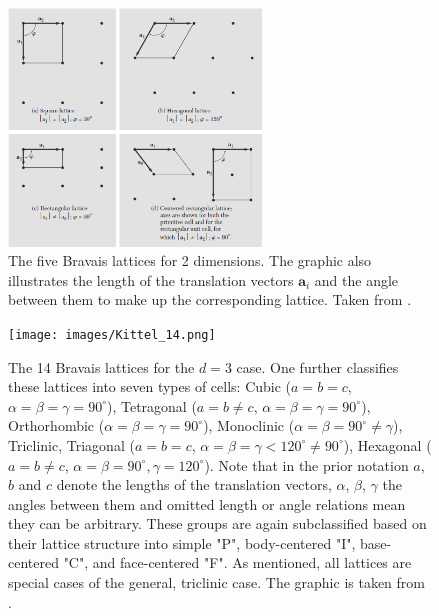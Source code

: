 \documentclass[11pt,a4paper]{article}
\begin{document}
\begin{figure}[htbp]
\centering
\includegraphics[width=0.6\textwidth]{images/Kittel_7.png}
\caption{The five Bravais lattices for 2 dimensions. The graphic also illustrates the length of the translation vectors $\bm{a}_i$ and the angle between them to make up the corresponding lattice. Taken from \cite[Fig. 7]{kittelChapter1Crystal2005}.}
\label{fig:bravais2D}
\end{figure}

\begin{figure}[htbp]
\centering
\texttt{[image: images/Kittel\_14.png]}
\caption{The 14 Bravais lattices for the $d=3$ case. 
One further classifies these lattices into seven types of cells: Cubic ($a{=}b{=}c$, $\alpha {=} \beta {=} \gamma{=}90^\circ$), Tetragonal ($a{=}b {\neq} c$, $\alpha {=} \beta {=} \gamma{=}90^\circ$), Orthorhombic ($\alpha {=} \beta {=} \gamma{=} 90^\circ$), Monoclinic ($\alpha {=} \beta{=}90^\circ {\neq} \gamma$), Triclinic, Triagonal ($a{=}b{=}c$, $\alpha {=} \beta {=} \gamma <120^\circ {\neq} 90^\circ$), Hexagonal ($a{=}b{\neq} c$, $\alpha {=} \beta{=} 90^\circ, \gamma{=} 120^\circ$). 
Note that in the prior notation $a$, $b$ and $c$ denote the lengths of the translation vectors, $\alpha$, $\beta$, $\gamma$ the angles between them and omitted length or angle relations mean they can be arbitrary. 
These groups are again subclassified based on their lattice structure into simple "P", body-centered "I", base-centered "C", and face-centered "F". 
As mentioned, all lattices are special cases of the general, triclinic case. The graphic is taken from \cite[Fig. 14]{kittelChapter1Crystal1971}.}
\label{fig:bravais3D}
\end{figure}
\end{document}
